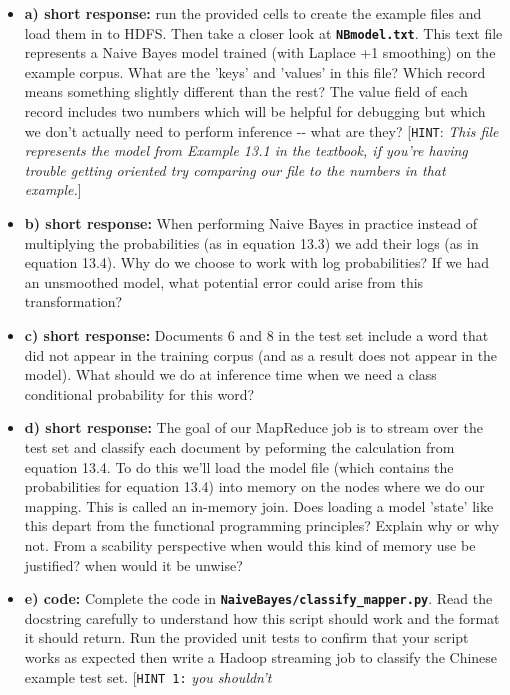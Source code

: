 \documentclass[11pt]{article}
\begin{document}
\begin{itemize}
\item
  \textbf{a) short response:} run the provided cells to create the
  example files and load them in to HDFS. Then take a closer look at
  \textbf{\texttt{NBmodel.txt}}. This text file represents a Naive Bayes
  model trained (with Laplace +1 smoothing) on the example corpus. What
  are the 'keys' and 'values' in this file? Which record means something
  slightly different than the rest? The value field of each record
  includes two numbers which will be helpful for debugging but which we
  don't actually need to perform inference -\/- what are they?
  {[}\texttt{HINT}: \emph{This file represents the model from Example
  13.1 in the textbook, if you're having trouble getting oriented try
  comparing our file to the numbers in that example.}{]}
\item
  \textbf{b) short response:} When performing Naive Bayes in practice
  instead of multiplying the probabilities (as in equation 13.3) we add
  their logs (as in equation 13.4). Why do we choose to work with log
  probabilities? If we had an unsmoothed model, what potential error
  could arise from this transformation?
\item
  \textbf{c) short response:} Documents 6 and 8 in the test set include
  a word that did not appear in the training corpus (and as a result
  does not appear in the model). What should we do at inference time
  when we need a class conditional probability for this word?
\item
  \textbf{d) short response:} The goal of our MapReduce job is to stream
  over the test set and classify each document by peforming the
  calculation from equation 13.4. To do this we'll load the model file
  (which contains the probabilities for equation 13.4) into memory on
  the nodes where we do our mapping. This is called an in-memory join.
  Does loading a model 'state' like this depart from the functional
  programming principles? Explain why or why not. From a scability
  perspective when would this kind of memory use be justified? when
  would it be unwise?
\item
  \textbf{e) code:} Complete the code in
  \textbf{\texttt{NaiveBayes/classify\_mapper.py}}. Read the docstring
  carefully to understand how this script should work and the format it
  should return. Run the provided unit tests to confirm that your script
  works as expected then write a Hadoop streaming job to classify the
  Chinese example test set. {[}\texttt{HINT\ 1:} \emph{you shouldn't
}
\end{itemize}
\end{document}
